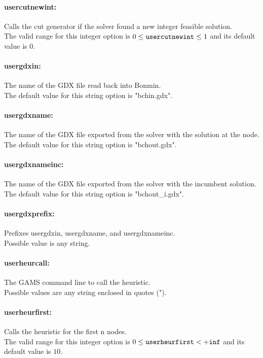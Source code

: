 \paragraph{usercutnewint:}\label{sec:usercutnewint} Calls the cut generator if the solver found a new integer feasible solution. $\;$ \\
 The valid range for this integer option is
$0 \le {\tt usercutnewint } \le 1$
and its default value is $0$.


\paragraph{usergdxin:}\label{sec:usergdxin} The name of the GDX file read back into Bonmin. $\;$ \\
The default value for this string option is "bchin.gdx".

\paragraph{usergdxname:}\label{sec:usergdxname} The name of the GDX file exported from the solver with the solution at the node. $\;$ \\
The default value for this string option is "bchout.gdx".

\paragraph{usergdxnameinc:}\label{sec:usergdxnameinc} The name of the GDX file exported from the solver with the incumbent solution. $\;$ \\
The default value for this string option is "bchout\_i.gdx".

\paragraph{usergdxprefix:}\label{sec:usergdxprefix} Prefixes usergdxin, usergdxname, and usergdxnameinc. $\;$ \\
Possible value is any string.

\paragraph{userheurcall:}\label{sec:userheurcall} The GAMS command line to call the heuristic. $\;$ \\
Possible values are any string enclosed in quotes (").

\paragraph{userheurfirst:}\label{sec:userheurfirst} Calls the heuristic for the first n nodes. $\;$ \\
 The valid range for this integer option is
$0 \le {\tt userheurfirst } <  {\tt +inf}$
and its default value is $10$.


